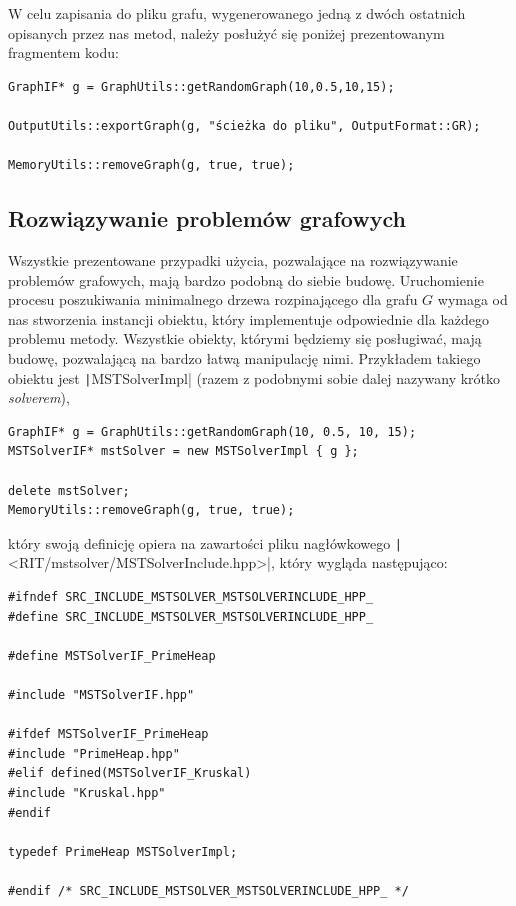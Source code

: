 W celu zapisania do pliku grafu, wygenerowanego jedną z dwóch ostatnich opisanych przez nas metod, należy posłużyć się poniżej prezentowanym fragmentem kodu:

\begin{verbatim}
GraphIF* g = GraphUtils::getRandomGraph(10,0.5,10,15);

OutputUtils::exportGraph(g, "ścieżka do pliku", OutputFormat::GR);

MemoryUtils::removeGraph(g, true, true);
\end{verbatim}

\subsection{Rozwiązywanie problemów grafowych}

Wszystkie prezentowane przypadki użycia, pozwalające na rozwiązywanie problemów grafowych, mają bardzo podobną do siebie budowę. Uruchomienie procesu poszukiwania minimalnego drzewa rozpinającego dla grafu $G$ wymaga od nas stworzenia instancji obiektu, który implementuje odpowiednie dla każdego problemu metody. Wszystkie obiekty, którymi będziemy się posługiwać, mają budowę, pozwalającą na bardzo łatwą manipulację nimi. Przykładem takiego obiektu jest \texttt|MSTSolverImpl| (razem z podobnymi sobie dalej nazywany krótko \textit{solverem}),

\begin{verbatim}
GraphIF* g = GraphUtils::getRandomGraph(10, 0.5, 10, 15);
MSTSolverIF* mstSolver = new MSTSolverImpl { g };

delete mstSolver;
MemoryUtils::removeGraph(g, true, true);
\end{verbatim}
który swoją definicję opiera na zawartości pliku nagłówkowego \texttt|<RIT/mstsolver/MSTSolverInclude.hpp>|, który wygląda następująco: 

\begin{verbatim}
#ifndef SRC_INCLUDE_MSTSOLVER_MSTSOLVERINCLUDE_HPP_
#define SRC_INCLUDE_MSTSOLVER_MSTSOLVERINCLUDE_HPP_

#define MSTSolverIF_PrimeHeap

#include "MSTSolverIF.hpp"

#ifdef MSTSolverIF_PrimeHeap
#include "PrimeHeap.hpp"
#elif defined(MSTSolverIF_Kruskal)
#include "Kruskal.hpp"
#endif

typedef PrimeHeap MSTSolverImpl;

#endif /* SRC_INCLUDE_MSTSOLVER_MSTSOLVERINCLUDE_HPP_ */
\end{verbatim}

